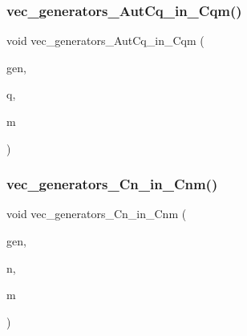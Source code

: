 \subsubsection{\texorpdfstring{vec\+\_\+generators\+\_\+\+Aut\+Cq\+\_\+in\+\_\+\+Cqm()}{vec\_generators\_AutCq\_in\_Cqm()}}
{\footnotesize\ttfamily void vec\+\_\+generators\+\_\+\+Aut\+Cq\+\_\+in\+\_\+\+Cqm (\begin{DoxyParamCaption}\item[{\mbox{\hyperlink{class_vector}{Vector}} \&}]{gen,  }\item[{\mbox{\hyperlink{galois_8h_a09fddde158a3a20bd2dcadb609de11dc}{I\+NT}}}]{q,  }\item[{\mbox{\hyperlink{galois_8h_a09fddde158a3a20bd2dcadb609de11dc}{I\+NT}}}]{m }\end{DoxyParamCaption})}

\mbox{\label{perm__group__gens_8_c_a1ac987f6157a88be8bee578587046082}} 
\subsubsection{\texorpdfstring{vec\+\_\+generators\+\_\+\+Cn\+\_\+in\+\_\+\+Cnm()}{vec\_generators\_Cn\_in\_Cnm()}}
{\footnotesize\ttfamily void vec\+\_\+generators\+\_\+\+Cn\+\_\+in\+\_\+\+Cnm (\begin{DoxyParamCaption}\item[{\mbox{\hyperlink{class_vector}{Vector}} \&}]{gen,  }\item[{\mbox{\hyperlink{galois_8h_a09fddde158a3a20bd2dcadb609de11dc}{I\+NT}}}]{n,  }\item[{\mbox{\hyperlink{galois_8h_a09fddde158a3a20bd2dcadb609de11dc}{I\+NT}}}]{m }\end{DoxyParamCaption})}

\mbox{\label{perm__group__gens_8_c_a3b4aa49d08bb6b5c3869db345c80e4b3}} 
